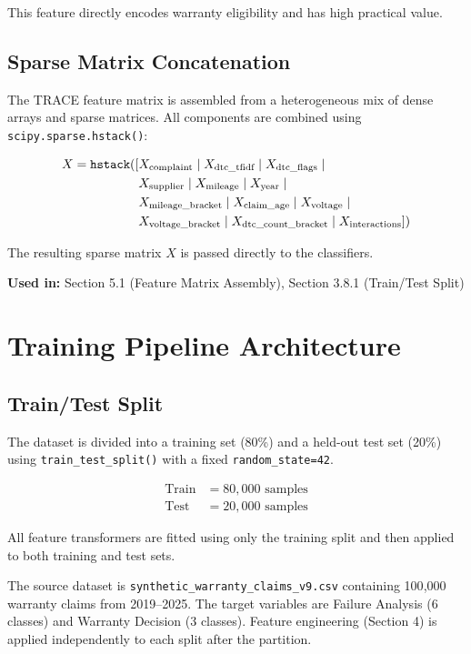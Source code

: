 \documentclass[10pt]{article}
\begin{document}
This feature directly encodes warranty eligibility and has high practical value.

\subsection{Sparse Matrix Concatenation}

The TRACE feature matrix is assembled from a heterogeneous mix of dense arrays and sparse matrices. All components are combined using \texttt{scipy.sparse.hstack()}:

\begin{align}
X = \texttt{hstack}([&X_{\text{complaint}} \mid X_{\text{dtc\_tfidf}} \mid X_{\text{dtc\_flags}} \mid {} \notag \\
&X_{\text{supplier}} \mid X_{\text{mileage}} \mid X_{\text{year}} \mid {} \notag \\
&X_{\text{mileage\_bracket}} \mid X_{\text{claim\_age}} \mid X_{\text{voltage}} \mid {} \notag \\
&X_{\text{voltage\_bracket}} \mid X_{\text{dtc\_count\_bracket}} \mid X_{\text{interactions}}])
\end{align}

The resulting sparse matrix \(X\) is passed directly to the classifiers.

\textbf{Used in:} Section 5.1 (Feature Matrix Assembly), Section 3.8.1 (Train/Test Split)

\section{Training Pipeline Architecture}

\subsection{Train/Test Split}

The dataset is divided into a training set (80\%) and a held-out test set (20\%) using \texttt{train\_test\_split()} with a fixed \texttt{random\_state=42}.

\begin{align}
\text{Train} &= 80{,}000 \text{ samples} \\
\text{Test} &= 20{,}000 \text{ samples}
\end{align}

All feature transformers are fitted using only the training split and then applied to both training and test sets.

The source dataset is \texttt{synthetic\_warranty\_claims\_v9.csv} containing 100{,}000 warranty claims from 2019--2025. The target variables are Failure Analysis (6 classes) and Warranty Decision (3 classes). Feature engineering (Section 4) is applied independently to each split after the partition.
\end{document}
